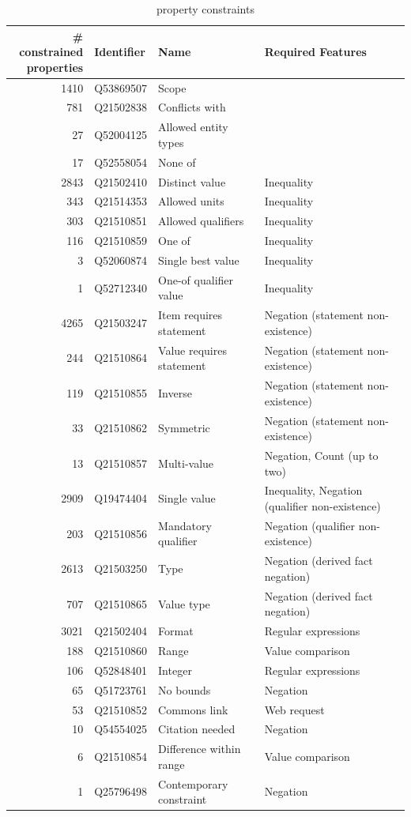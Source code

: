 \documentclass[hyperref,bachelorofscience,fleqn]{cgvpub}
\begin{document}
\begin{table}[H]
\caption{property constraints}\label{tab_property_constraints}
\begin{tabularx}{\textheight}{rlll}
\makecell{\# constrained\\ properties} & Identifier & Name & Required Features \\
\hline
1410 & Q53869507 & Scope &  \\
781 & Q21502838 & Conflicts with &  \\
27 & Q52004125 & Allowed entity types &  \\
17 & Q52558054 & None of &  \\
\hline
2843 & Q21502410 & Distinct value & Inequality \\
343 & Q21514353 & Allowed units & Inequality \\
303 & Q21510851 & Allowed qualifiers & Inequality \\
116 & Q21510859 & One of & Inequality \\
3 & Q52060874 & Single best value & Inequality \\
1 & Q52712340 & One-of qualifier value & Inequality \\
\hline
4265 & Q21503247 & Item requires statement & Negation (statement non-existence) \\
244 & Q21510864 & Value requires statement & Negation (statement non-existence) \\
119 & Q21510855 & Inverse & Negation (statement non-existence) \\
33 & Q21510862 & Symmetric & Negation (statement non-existence) \\
13 & Q21510857 & Multi-value & Negation, Count (up to two) \\
2909 & Q19474404 & Single value & Inequality, Negation (qualifier non-existence) \\
203 & Q21510856 & Mandatory qualifier & Negation (qualifier non-existence) \\
\hline
2613 & Q21503250 & Type & Negation (derived fact negation) \\
707 & Q21510865 & Value type & Negation (derived fact negation) \\
3021 & Q21502404 & Format & Regular expressions \\
188 & Q21510860 & Range & Value comparison \\
106 & Q52848401 & Integer & Regular expressions \\
65 & Q51723761 & No bounds & Negation \\
53 & Q21510852 & Commons link & Web request \\
10 & Q54554025 & Citation needed & Negation \\
6 & Q21510854 & Difference within range & Value comparison \\
1 & Q25796498 & Contemporary constraint & Negation \\
\end{tabularx}
\end{table}
\end{document}
